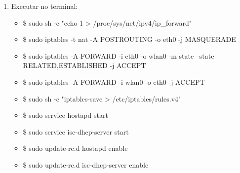\begin{enumerate}
    \item Executar no terminal:
        \begin{itemize}
            \item \$ sudo sh -c "echo 1 > /proc/sys/net/ipv4/ip\_forward"

            \item \$ sudo iptables -t nat -A POSTROUTING -o eth0 -j MASQUERADE

            \item \$ sudo iptables -A FORWARD -i eth0 -o wlan0 -m state --state RELATED,ESTABLISHED -j ACCEPT

            \item \$ sudo iptables -A FORWARD -i wlan0 -o eth0 -j ACCEPT

            \item \$ sudo sh -c "iptables-save > /etc/iptables/rules.v4"

            \item \$ sudo service hostapd start

            \item \$ sudo service isc-dhcp-server start

            \item \$ sudo update-rc.d hostapd enable

            \item \$ sudo update-rc.d isc-dhcp-server enable

        \end{itemize}
\end{enumerate}
